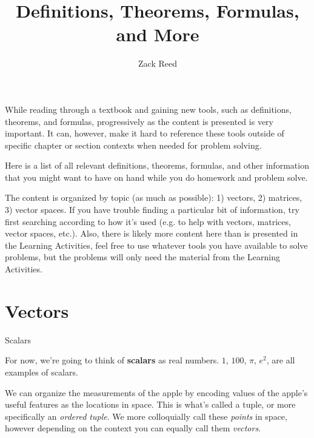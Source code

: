 \documentclass{ximera}
\author{Zack Reed}
\title{Definitions, Theorems, Formulas, and More}
\begin{document}
\begin{abstract}

\end{abstract}
\maketitle

While reading through a textbook and gaining new tools, such as definitions, theorems, and formulas, progressively as the content is presented is very important. It can, however, make it hard to reference these tools outside of specific chapter or section contexts when needed for problem solving.

Here is a list of all relevant definitions, theorems, formulas, and other information that you might want to have on hand while you do homework and problem solve.

The content is organized by topic (as much as possible): 1) vectors, 2) matrices, 3) vector spaces. If you have trouble finding a particular bit of information, try first searching according to how it's used (e.g. to help with vectors, matrices, vector spaces, etc.). Also, there is likely more content here than is presented in the Learning Activities, feel free to use whatever tools you have available to solve problems, but the problems will only need the material from the Learning Activities.

\section{Vectors}

\begin{definition}{Scalars}\label{def:scalars1}

    For now, we're going to think of \textbf{scalars} as real numbers. $1$, $100$, $\pi$, $e^2$, are all examples of scalars.

\end{definition}

\begin{definition}\label{def:tuples}
We can organize the measurements of the apple by encoding values of the apple's useful features as the locations in space. This is what's called a tuple, or more specifically an \textit{ordered tuple}. We more colloquially call these \textit{points} in space, however depending on the context you can equally call them \textit{vectors}.
\end{definition}
\end{document}
